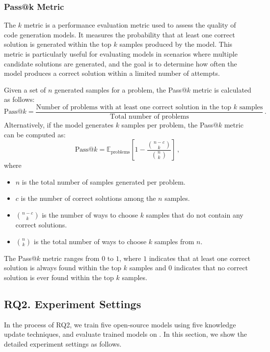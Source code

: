 \subsubsection{Pass@k Metric}

The $k$ metric is a performance evaluation metric used to assess the quality of code generation models. It measures the probability that at least one correct solution is generated within the top \( k \) samples produced by the model. This metric is particularly useful for evaluating models in scenarios where multiple candidate solutions are generated, and the goal is to determine how often the model produces a correct solution within a limited number of attempts.

Given a set of \( n \) generated samples for a problem, the Pass@$k$ metric is calculated as follows:
\[
\text{Pass@}k = \frac{\text{Number of problems with at least one correct solution in the top } k \text{ samples}}{\text{Total number of problems}}\,.
\]
Alternatively, if the model generates \( k \) samples per problem, the Pass@$k$ metric can be computed as:
\[
\text{Pass@}k = \mathbb{E}_{\text{problems}} \left[ 1 - \frac{\binom{n - c}{k}}{\binom{n}{k}} \right]\,,
\]
where
\begin{itemize}
    \vspace{-0.5em}
    \item \( n \) is the total number of samples generated per problem.
    \vspace{-0.5em}
    \item \( c \) is the number of correct solutions among the \( n \) samples.
    \vspace{-0.5em}
    \item \( \binom{n - c}{k} \) is the number of ways to choose \( k \) samples that do not contain any correct solutions.
    \vspace{-0.5em}
    \item \( \binom{n}{k} \) is the total number of ways to choose \( k \) samples from \( n \).
\end{itemize}
The Pass@$k$ metric ranges from $0$ to $1$, where $1$ indicates that at least one correct solution is always found within the top \( k \) samples and $0$ indicates that no correct solution is ever found within the top \( k \) samples.

\subsection{RQ2. Experiment Settings}
\label{rq2_exp_settings}
In the process of RQ2, we train five open-source models using five knowledge update techniques, and evaluate trained models on \benchmark. In this section, we show the detailed experiment settings as follows.

